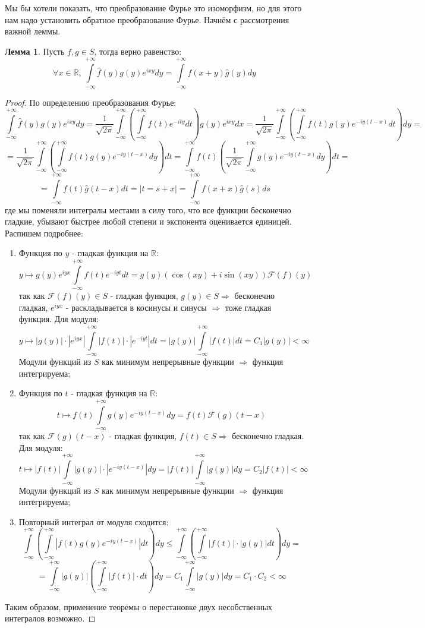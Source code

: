 \documentclass[12pt]{article}
\newcommand{\MR}{\mathbb{R}}
\theoremstyle{definition}
\newtheorem{lemma}{Лемма}
\newcommand{\ddint}[2]{\displaystyle\int\limits_{#1}^{#2}}
\newcommand{\wht}[1]{\widehat{#1}}
\newcommand{\fourt}[1]{\mathcal{F}\left(#1\right)}
\begin{document}
Мы бы хотели показать, что преобразование Фурье это изоморфизм, но для этого нам надо установить обратное преобразование Фурье. Начнём с рассмотрения важной леммы.
\begin{lemma}
	Пусть $f,g \in S$, тогда верно равенство:
	$$
		\forall x \in \MR, \, \ddint{-\infty}{+\infty}\wht{f}(y)g(y)e^{ixy}dy = \ddint{-\infty}{+\infty}f(x + y)\wht{g}(y)dy
	$$
\end{lemma}
\begin{proof}
	По определению преобразования Фурье:
	$$
		\ddint{-\infty}{+\infty}\wht{f}(y)g(y)e^{ixy}dy = \dfrac{1}{\sqrt{2\pi}}\ddint{-\infty}{+\infty}\left(\ddint{-\infty}{+\infty}f(t)e^{-ity}dt\right)g(y)e^{ixy}dx = \dfrac{1}{\sqrt{2\pi}}\ddint{-\infty}{+\infty}\left(\ddint{-\infty}{+\infty}f(t)g(y)e^{-iy(t-x)}dt\right)dy = 
	$$
	$$
		=\dfrac{1}{\sqrt{2\pi}}\ddint{-\infty}{+\infty}\left(\ddint{-\infty}{+\infty}f(t)g(y)e^{-iy(t-x)}dy\right)dt = \ddint{-\infty}{+\infty}f(t)\left(\dfrac{1}{\sqrt{2\pi}}\ddint{-\infty}{+\infty}g(y)e^{-iy(t-x)}dy\right)dt =
	$$
	$$
		=	\ddint{-\infty}{+\infty}f(t)\wht{g}(t-x)dt =|t = s + x| = \ddint{-\infty}{+\infty}f(x + x)\wht{g}(s)ds
	$$
	где мы поменяли интегралы местами в силу того, что все функции бесконечно гладкие,  убывают быстрее любой степени и экспонента оценивается единицей. Распишем подробнее:
	\begin{enumerate}[label=\arabic*)]
		\item Функция по $y$ - гладкая функция на $\MR$:
		$$
			y \mapsto g(y) e^{iyx}\ddint{-\infty}{+\infty}f(t)e^{-iyt}dt = g(y) (\cos{(xy)} + i\sin{(xy)})\fourt{f}(y)
		$$
		так как $\fourt{f}(y) \in S$ - гладкая функция, $g(y) \in S \Rightarrow$ бесконечно гладкая, $e^{iyx}$ - раскладывается в косинусы и синусы $\Rightarrow$ тоже гладкая функция. Для модуля:
		$$
			y \mapsto |g(y)|{\cdot} |e^{iyx}|\ddint{-\infty}{+\infty}|f(t)|{\cdot}\left|e^{-iyt}\right|dt = |g(y)|\ddint{-\infty}{+\infty}|f(t)|dt = C_1|g(y)| < \infty
		$$
		Модули функций из $S$ как минимум непрерывные функции $\Rightarrow$ функция интегрируема;
		\item Функция по $t$ - гладкая функция на $\MR$:
		$$
			t \mapsto f(t) \ddint{-\infty}{+\infty}g(y)e^{-iy(t-x)}dy = f(t)\fourt{g}(t-x)
		$$
		так как $\fourt{g}(t-x)$ - гладкая функция, $f(t) \in S \Rightarrow$ бесконечно гладкая. Для модуля:
		$$
			t \mapsto |f(t)| \ddint{-\infty}{+\infty}|g(y)|{\cdot}\left|e^{-iy(t-x)}\right|dy = |f(t)|\ddint{-\infty}{+\infty}|g(y)|dy = C_2|f(t)|< \infty
		$$
		Модули функций из $S$ как минимум непрерывные функции $\Rightarrow$ функция интегрируема;
		\item Повторный интеграл от модуля сходится:
		$$
			\ddint{-\infty}{+\infty}\left(\ddint{-\infty}{+\infty}\left|f(t)g(y)e^{-iy(t-x)}\right|dt\right)dy \leq
			\ddint{-\infty}{+\infty}\left(\ddint{-\infty}{+\infty}|f(t)|{\cdot}|g(y)|dt\right)dy =
		$$
		$$	
			= \ddint{-\infty}{+\infty}|g(y)|\left(\ddint{-\infty}{+\infty}|f(t)|{\cdot}dt\right)dy = C_1\ddint{-\infty}{+\infty}|g(y)|dy = C_1{\cdot}C_2 < \infty
		$$
		
	\end{enumerate}
	Таким образом, применение теоремы о перестановке двух несобственных интегралов возможно.
\end{proof}
\end{document}
